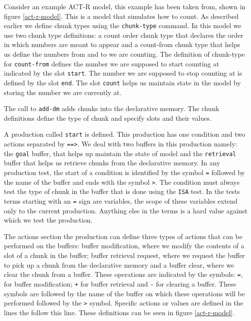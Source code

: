 Consider an example ACT-R model, this example has been taken
from\cite{actr-tut}, shown in figure \ref{act-r-model}. This is a
model that simulates how to count. As described earlier we define
chunk types using the \texttt{chunk-type} command. In this model we
use two chunk type definitions: a count order chunk type that declares
the order in which numbers are meant to appear and a count-from chunk
type that helps us define the numbers from and to we are counting. The
definition of chunk-type for \texttt{count-from} defines the number we
are supposed to start counting at indicated by the slot
\texttt{start}. The number we are supposed to stop counting at is
defined by the slot \texttt{end}. The slot \texttt{count} helps us
maintain state in the model by storing the number we are currently
at. 

The call to \texttt{add-dm} adds chunks into the declarative
memory. The chunk definitions define the type of chunk and specify
slots and their values.

A production called \texttt{start} is defined. This production has one
condition and two actions separated by \texttt{==>}. We deal with two
buffers in this production namely: the \texttt{goal} buffer, that
helps up maintain the state of model and the \texttt{retrieval} buffer
that helps us retrieve chunks from the declarative memory. In any
production test, the start of a condition is identified by the symbol
\texttt{=} followed by the name of the buffer and ends with the symbol
\texttt{>}. The condition must always test the type of chunk in the
buffer that is done using the \texttt{ISA} test. In the tests terms
starting with an \texttt{=} sign are variables, the scope of these
variables extend only to the current production. Anything else in the
terms is a hard value against which we test the production.

The actions section the production can define three types of actions
that can be performed on the buffers: buffer modification, where we
modify the contents of a slot of a chunk in the buffer; buffer
retrieval request, where we request the buffer to pick up a chunk from
the declarative memory and a buffer clear, where we clear the chunk
from a buffer. These operations are indicated by the symbols:
\texttt{=}, for buffer modification; \texttt{+} for buffer retrieval
and \texttt{-} for clearing a buffer. These symbols are followed by
the name of the buffer on which these operations will be performed
followed by the \texttt{>} symbol. Specific actions or values are
defined in the lines the follow this line. These definitions can be
seen in figure \ref{act-r-model}.
  

